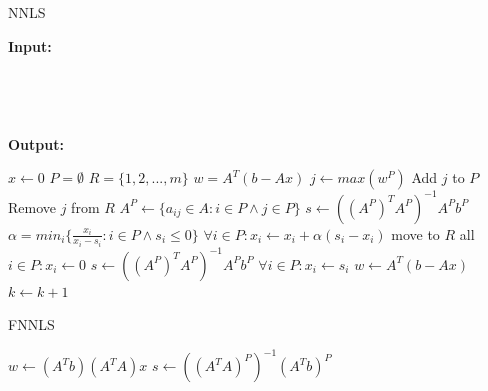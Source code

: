 \begin{algorithm}[h]
  \begin{flushleft}
  \caption{NNLS}
  \label{alg:nnls}
  \textbf{Input:} \\
  \hspace*{\algorithmicindent} \\
  \hspace*{\algorithmicindent} \\
  \hspace*{\algorithmicindent}  \\
  \hspace*{\algorithmicindent}  \\
  \textbf{Output:} \\
  \hspace*{\algorithmicindent} 
  \end{flushleft}
  \begin{algorithmic}[1]
      \State $x \gets 0$
      \State $P=\emptyset$
      \State $R=\{ 1, 2, ..., m \}$
      \State $w=A^T(b - Ax)$ 
        \State $j \gets max(w^P)$ 
        \State Add $j$ to $P$
        \State Remove $j$ from $R$
        \State $A^P \gets  \{a_{ij} \in A : i \in P \land j \in P\}$
        \State $s \gets ((A^P)^T A^P)^{-1}A^P b^P$ 
          \State $\alpha=min_i\{\frac{x_i}{x_i-s_i} : i \in P \land s_i \leq 0 \}$
          \State $ \forall i \in P : x_i \gets x_i + \alpha (s_i - x_i)$
          \State move to $R$ all $i \in P : x_i \gets 0$
          \State $s \gets ((A^P)^T A^P)^{-1}A^P b^P$ 
          \EndWhile
        \State $\forall i \in P : x_i \gets s_i$
        \State $w \gets A^T(b - Ax)$
        \State $k \gets k+1$
      \EndWhile
    \EndFunction
  \end{algorithmic}
\end{algorithm}

\begin{algorithm}[h]
  \caption{FNNLS}
  \label{alg:fnnls}
  \begin{algorithmic}[1]
    \State $w \gets (A^T b) (A^T A)x $
    \State $s \gets ((A^TA)^P)^{-1} (A^Tb)^P$
  \end{algorithmic}
\end{algorithm}